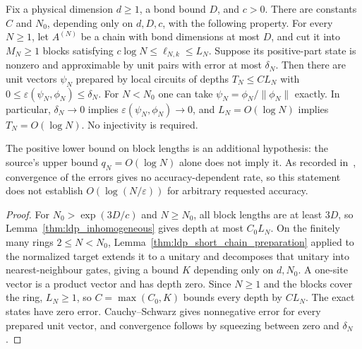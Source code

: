 \begin{lemma}
    \label{thm:ldp_inhomogeneous_sequence}
    \leanok
    Fix a physical dimension $d\ge1$, a bond bound $D$, and $c>0$.
    There are constants $C$ and $N_0$, depending only on $d,D,c$, with the
    following property. For every $N\ge1$, let $A^{(N)}$ be a chain with bond
    dimensions at most $D$, and cut it into $M_N\ge1$ blocks satisfying
    $c\log N\le\ell_{N,k}\le L_N$.
    Suppose its positive-part state is nonzero and approximable by unit pairs
    with error at most $\delta_N$. Then there are unit vectors $\psi_N$ prepared
    by local circuits of depths $T_N\le CL_N$ with
    $0\le\varepsilon(\psi_N,\phi_N)\le\delta_N$.
    For $N<N_0$ one can take $\psi_N=\phi_N/\lVert\phi_N\rVert$ exactly.
    In particular, $\delta_N\to0$ implies
    $\varepsilon(\psi_N,\phi_N)\to0$, and $L_N=O(\log N)$ implies
    $T_N=O(\log N)$. No injectivity is required.

    The positive lower bound on block lengths is an additional hypothesis:
    the source's upper bound $q_N=O(\log N)$ alone does not imply it.
    As recorded in~\cite{gap:mswc24_inhomogeneous_scope}, convergence of the
    errors gives no accuracy-dependent rate, so this statement does not
    establish $O(\log(N/\varepsilon))$ for arbitrary requested accuracy.
\end{lemma}
\begin{proof}
    \leanok
    For $N_0>\exp(3D/c)$ and $N\ge N_0$, all block lengths are at least
    $3D$, so Lemma~\ref{thm:ldp_inhomogeneous} gives depth at most $C_0L_N$.
    On the finitely many rings $2\le N<N_0$,
    Lemma~\ref{thm:ldp_short_chain_preparation} applied to the normalized target
    extends it to a unitary and decomposes that unitary into nearest-neighbour
    gates, giving a bound $K$ depending only on $d,N_0$. A one-site vector is a
    product vector and has depth zero. Since $N\ge1$ and the blocks cover the
    ring, $L_N\ge1$, so $C=\max(C_0,K)$ bounds every depth by $CL_N$.
    The exact states have zero error. Cauchy--Schwarz gives nonnegative error
    for every prepared unit vector, and convergence follows by squeezing
    between zero and $\delta_N$.
\end{proof}

